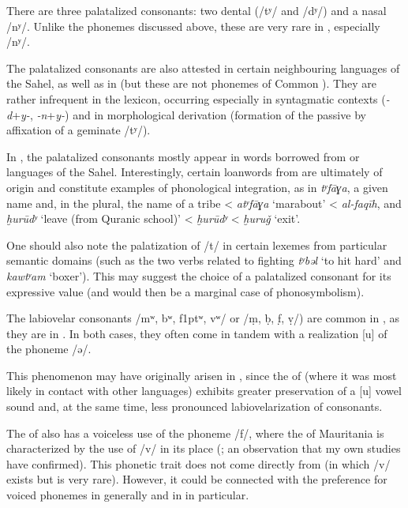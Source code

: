 \documentclass[output=paper]{langsci/langscibook}
\begin{document}
There are three palatalized consonants: two dental (/tʸ/ and /dʸ/) and a nasal /nʸ/. Unlike the phonemes discussed above, these are very rare in , especially /nʸ/.

The palatalized consonants are also attested in certain neighbouring languages of the Sahel, as well as in  (but these are not phonemes of Common ). They are rather infrequent in the  lexicon, occurring especially in syntagmatic contexts (\textit{{}-d}+\textit{y-}, \textit{{}-n}+\textit{y-}) and in morphological {derivation} ({formation} of the {passive} by affixation of a geminate /tʸ/).

In , the palatalized consonants mostly appear in words borrowed from  or languages of the Sahel. Interestingly, certain {loanwords} from  are ultimately of  origin and constitute examples of phonological integration, as in \textit{tʸfāɣa}, a given name and, in the plural, the name of a tribe <  \textit{atʸfāɣa} ‘marabout’ <  \textit{al-faqīh}, and \textit{ḫurūdʸ} ‘leave (from Quranic school)’ <  \textit{ḫurūdʸ} <  \textit{ḫuruǧ} ‘exit’.

One should also note the palatization of /t/ in certain lexemes from particular semantic domains (such as the two verbs related to fighting \textit{tʸbəl} ‘to hit hard’ and \textit{kawtʸam} ‘boxer’). This may suggest the choice of a palatalized consonant for its expressive value (and would then be a marginal case of phonosymbolism).

The labiovelar consonants /mʷ, bʷ, f\kern 1ptʷ, vʷ/ or /ṃ, ḅ, f̣, ṿ/) are common in , as they are in . In both cases, they often come in tandem with a realization [u] of the {phoneme} /ə/. 

This phenomenon may have originally arisen in , since the  of  (where it was most likely in contact with other languages) exhibits greater preservation of a [u] vowel sound and, at the same time, less pronounced labiovelarization of consonants. 

The  of  also has a voiceless use of the {phoneme} /f/, where the  of Mauritania is characterized by the use of /v/ in its place (\citealt{Heath2004}; an observation that my own studies have confirmed). This phonetic trait does not come directly from  (in which /v/ exists but is very rare). However, it could be connected with the preference for voiced phonemes in  generally and in  in particular.
\end{document}
